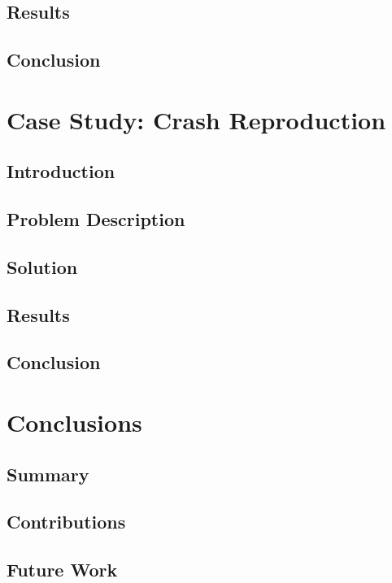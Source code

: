   \section{Results}
  \label{sec:results}
    \Blindtext
  \section{Conclusion}
  \label{sec:conclusion}
    \Blindtext

\chapter{Case Study: Crash Reproduction}
\label{chap:beacon}
  \section{Introduction}
  \label{sec:introduction}
    \Blindtext
  \section{Problem Description}
  \label{sec:problem_description}
    \Blindtext
  \section{Solution}
  \label{sec:solution}
    \Blindtext
  \section{Results}
  \label{sec:results}
    \Blindtext
  \section{Conclusion}
  \label{sec:conclusion}
    \Blindtext

\chapter{Conclusions}
\label{chap:conclusions}
  \section{Summary}
  \label{sec:summary}
    \Blindtext
  \section{Contributions}
  \label{sec:contributions}
    \Blindtext
  \section{Future Work}
  \label{sec:future_work}
